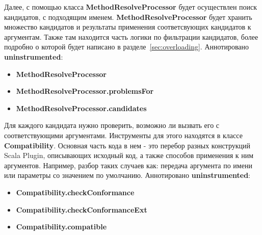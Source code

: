 Далее, с помощью класса \textbf{MethodResolveProcessor} будет осуществлен
поиск кандидатов, с подходящим именем.
\textbf{MethodResolveProcessor} будет хранить множество кандидатов и
результаты применения соответсвующих кандидатов к аргументам.
Также там находится часть логики по фильтрации кандидатов, более подробно о которой
будет написано в разделе~\ref{sec:overloading}.
Аннотировано \textbf{uninstrumented}:
\begin{itemize}
  \item \textbf{MethodResolveProcessor}
  \item \textbf{MethodResolveProcessor.problemsFor}
  \item \textbf{MethodResolveProcessor.candidates}
\end{itemize}

Для каждого кандидата нужно проверить, возможно ли вызвать его с соответствующими
аргументами.
Инструменты для этого находятся в классе \textbf{Compatibility}.
Основная часть кода в нем - это перебор разных конструкций Scala Plugin,
описывающих исходный код, а также способов применения к ним аргументов.
Например, разбор таких случаев как: передача аргумента по имени или параметры со
значением по умолчанию.
Аннотировано \textbf{uninstrumented}:
\begin{itemize}
  \item \textbf{Compatibility.checkConformance}
  \item \textbf{Compatibility.checkConformanceExt}
  \item \textbf{Compatibility.compatible}
\end{itemize}

